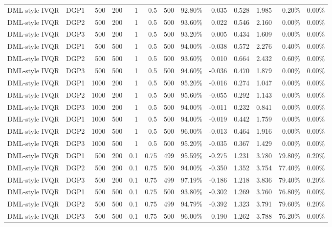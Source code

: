 \begin{landscape}
\begin{longtable}{llrrrrrrrrrrr}
DML-style IVQR & DGP1 & 500 & 200 & 1 & 0.5 & 500 & 92.80\% & -0.035 & 0.528 & 1.985 & 0.20\% & 0.00\% \\
DML-style IVQR & DGP2 & 500 & 200 & 1 & 0.5 & 500 & 93.60\% & 0.022 & 0.546 & 2.160 & 0.00\% & 0.00\% \\
DML-style IVQR & DGP3 & 500 & 200 & 1 & 0.5 & 500 & 93.20\% & 0.005 & 0.434 & 1.609 & 0.00\% & 0.00\% \\
DML-style IVQR & DGP1 & 500 & 500 & 1 & 0.5 & 500 & 94.00\% & -0.038 & 0.572 & 2.276 & 0.40\% & 0.00\% \\
DML-style IVQR & DGP2 & 500 & 500 & 1 & 0.5 & 500 & 93.60\% & 0.010 & 0.664 & 2.432 & 0.60\% & 0.00\% \\
DML-style IVQR & DGP3 & 500 & 500 & 1 & 0.5 & 500 & 94.60\% & -0.036 & 0.470 & 1.879 & 0.00\% & 0.00\% \\
DML-style IVQR & DGP1 & 1000 & 200 & 1 & 0.5 & 500 & 95.20\% & -0.016 & 0.274 & 1.047 & 0.00\% & 0.00\% \\
DML-style IVQR & DGP2 & 1000 & 200 & 1 & 0.5 & 500 & 95.60\% & -0.055 & 0.292 & 1.143 & 0.00\% & 0.00\% \\
DML-style IVQR & DGP3 & 1000 & 200 & 1 & 0.5 & 500 & 94.00\% & -0.011 & 0.232 & 0.841 & 0.00\% & 0.00\% \\
DML-style IVQR & DGP1 & 1000 & 500 & 1 & 0.5 & 500 & 94.00\% & -0.019 & 0.442 & 1.759 & 0.00\% & 0.00\% \\
DML-style IVQR & DGP2 & 1000 & 500 & 1 & 0.5 & 500 & 96.00\% & -0.013 & 0.464 & 1.916 & 0.00\% & 0.00\% \\
DML-style IVQR & DGP3 & 1000 & 500 & 1 & 0.5 & 500 & 95.20\% & -0.035 & 0.367 & 1.429 & 0.00\% & 0.00\% \\
DML-style IVQR & DGP1 & 500 & 200 & 0.1 & 0.75 & 499 & 95.59\% & -0.275 & 1.231 & 3.780 & 79.80\% & 0.20\% \\
DML-style IVQR & DGP2 & 500 & 200 & 0.1 & 0.75 & 500 & 94.00\% & -0.350 & 1.352 & 3.754 & 77.40\% & 0.00\% \\
DML-style IVQR & DGP3 & 500 & 200 & 0.1 & 0.75 & 499 & 97.19\% & -0.186 & 1.218 & 3.836 & 79.40\% & 0.20\% \\
DML-style IVQR & DGP1 & 500 & 500 & 0.1 & 0.75 & 500 & 93.80\% & -0.302 & 1.269 & 3.760 & 76.80\% & 0.00\% \\
DML-style IVQR & DGP2 & 500 & 500 & 0.1 & 0.75 & 499 & 94.79\% & -0.392 & 1.323 & 3.791 & 79.60\% & 0.20\% \\
DML-style IVQR & DGP3 & 500 & 500 & 0.1 & 0.75 & 500 & 96.00\% & -0.190 & 1.262 & 3.788 & 76.20\% & 0.00\% \\

\end{longtable}
\end{landscape}
